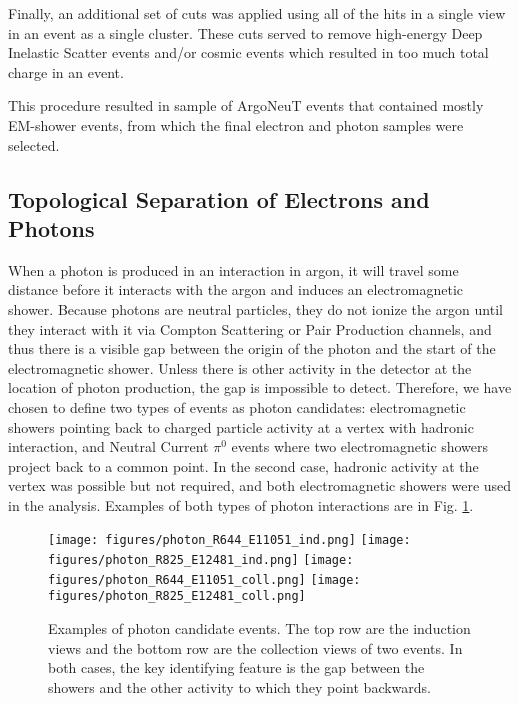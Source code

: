 Finally, an additional set of cuts was applied using all of the hits in a single view in 
an event as a single cluster. These cuts served to remove high-energy Deep 
Inelastic Scatter events and/or cosmic events which resulted in too much total 
charge in an event. 

This procedure resulted in sample of ArgoNeuT events that contained mostly EM-shower events, from which the final electron and photon samples were selected.

\subsection{Topological Separation of Electrons and Photons}
\label{sec:topology_cut}

When a photon is produced in an interaction in argon, it will travel some 
distance before it interacts with the argon and induces an electromagnetic 
shower.  Because photons are neutral particles, they do not ionize the argon 
until they interact with it via Compton Scattering or Pair Production channels, 
and thus there is a visible gap between the origin of the photon and the start 
of the electromagnetic shower. Unless there is other activity in the detector at the location of photon 
production, the gap is impossible to detect. Therefore, we have chosen to define two types of events as photon 
candidates: electromagnetic showers pointing back to charged particle activity 
at a vertex with hadronic interaction, and Neutral Current $\pi^0$ events where two 
electromagnetic showers project back to a common point.  In the second case, 
hadronic activity at the vertex was possible but not required, and both 
electromagnetic showers were used in the analysis.  Examples of both types of 
photon interactions are in Fig. \ref{fig:photons}.

\begin{figure}[h]
\centering
\texttt{[image: figures/photon\_R644\_E11051\_ind.png]}
\texttt{[image: figures/photon\_R825\_E12481\_ind.png]}
\texttt{[image: figures/photon\_R644\_E11051\_coll.png]}
\texttt{[image: figures/photon\_R825\_E12481\_coll.png]}
\caption{\label{fig:photons} Examples of photon candidate events.  The top row 
are the induction views and the bottom row are the collection views of two events. 
In both cases, the key identifying feature is the gap between 
the showers and the other activity to which they point backwards.}
\end{figure}

